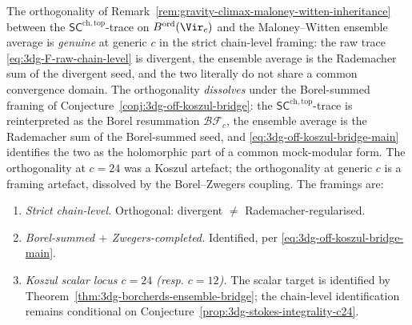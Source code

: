 \begin{remark}
\label{rem:3dg-off-koszul-orthogonality}
%
The orthogonality of Remark~\ref*{rem:gravity-climax-maloney-witten-inheritance}
between the $\mathsf{SC}^{\mathrm{ch,top}}$-trace on
$B^{\mathrm{ord}}(\Vir_{c})$ and the Maloney--Witten ensemble average
is \emph{genuine} at generic $c$ in the strict chain-level framing:
the raw trace \eqref{eq:3dg-F-raw-chain-level} is divergent, the
ensemble average is the Rademacher sum of the divergent seed, and
the two literally do not share a common convergence domain. The
orthogonality \emph{dissolves} under the Borel-summed framing of
Conjecture~\ref{conj:3dg-off-koszul-bridge}: the
$\mathsf{SC}^{\mathrm{ch,top}}$-trace is reinterpreted as the Borel
resummation $\mathcal B\mathcal F_{c}$, the ensemble average is the
Rademacher sum of the Borel-summed seed, and
\eqref{eq:3dg-off-koszul-bridge-main} identifies the two as the
holomorphic part of a common mock-modular form. The orthogonality
at $c = 24$ was a Koszul artefact; the orthogonality at generic $c$
is a framing artefact, dissolved by the Borel--Zwegers coupling. The
framings are:
\begin{enumerate}[label=\textup{(\alph*)}]
\item \emph{Strict chain-level.} Orthogonal: divergent
$\neq$ Rademacher-regularised.
\item \emph{Borel-summed$\,+\,$Zwegers-completed.} Identified, per
\eqref{eq:3dg-off-koszul-bridge-main}.
\item \emph{Koszul scalar locus \(c=24\) \textup{(resp. \(c=12\)).}}
The scalar target is identified by
Theorem~\ref{thm:3dg-borcherds-ensemble-bridge}; the chain-level
identification remains conditional on
Conjecture~\ref{prop:3dg-stokes-integrality-c24}.
\end{enumerate}
\end{remark}

